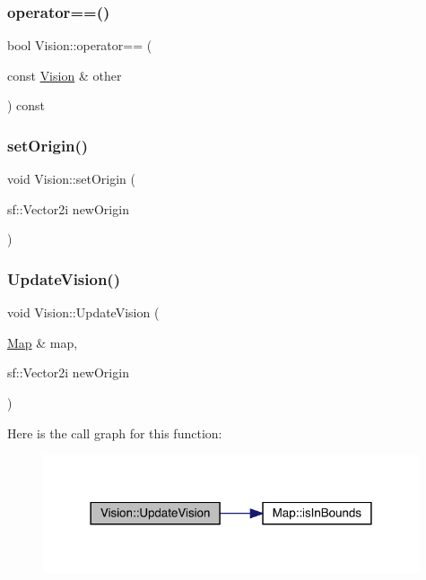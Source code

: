 \subsubsection{\texorpdfstring{operator==()}{operator==()}}
{\footnotesize\ttfamily bool Vision\+::operator== (\begin{DoxyParamCaption}\item[{const \mbox{\hyperlink{class_vision}{Vision}} \&}]{other }\end{DoxyParamCaption}) const}

\mbox{\label{class_vision_a5f26ef8f946b7cf29e533797bf474954}} 
\subsubsection{\texorpdfstring{set\+Origin()}{setOrigin()}}
{\footnotesize\ttfamily void Vision\+::set\+Origin (\begin{DoxyParamCaption}\item[{sf\+::\+Vector2i}]{new\+Origin }\end{DoxyParamCaption})}

\mbox{\label{class_vision_a626452b58aa651ff91e4e60a74ce7443}} 
\subsubsection{\texorpdfstring{Update\+Vision()}{UpdateVision()}}
{\footnotesize\ttfamily void Vision\+::\+Update\+Vision (\begin{DoxyParamCaption}\item[{\mbox{\hyperlink{class_map}{Map}} \&}]{map,  }\item[{sf\+::\+Vector2i}]{new\+Origin }\end{DoxyParamCaption})}

Here is the call graph for this function\+:
\nopagebreak
\begin{figure}[H]
\begin{center}
\leavevmode
\includegraphics[width=314pt]{da/d76/class_vision_a626452b58aa651ff91e4e60a74ce7443_cgraph}
\end{center}
\end{figure}


